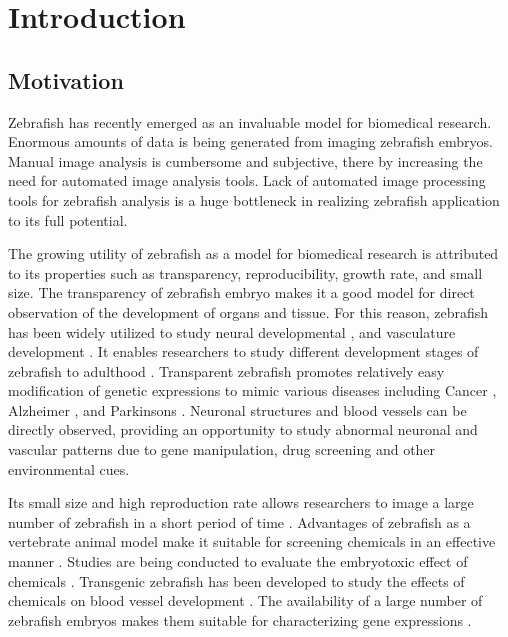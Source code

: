 \chapter{Introduction}\label{chap:Intro}

\section{Motivation}

Zebrafish has recently emerged as an invaluable model for biomedical research. Enormous amounts of data is being generated from imaging zebrafish embryos. Manual image analysis is cumbersome and subjective, there by increasing the need for automated image analysis tools. Lack of automated image processing tools for zebrafish analysis is a huge bottleneck in realizing zebrafish application to its full potential.

\par
The growing utility of zebrafish as a model for biomedical research is attributed to its properties such as transparency, reproducibility, growth rate, and small size. The transparency of zebrafish embryo makes it a good model for direct observation of the development of organs and tissue. For this reason, zebrafish has been widely utilized to study neural developmental \cite{campbell2006}, and vasculature development \cite{fouquet1997}. It enables researchers to study different development stages of zebrafish to adulthood \cite{Kimmel95}. Transparent zebrafish promotes relatively easy modification of genetic expressions to mimic various diseases including Cancer \cite{Amatruda08}, Alzheimer \cite{Newman11}, and Parkinsons \cite{Boehmler09}. Neuronal structures and blood vessels can be directly observed, providing an opportunity to study abnormal neuronal and vascular patterns due to gene manipulation, drug screening and other environmental cues.

\par
Its small size and high reproduction rate allows researchers to image a large number of zebrafish in a short period of time \cite{Leonard05}. Advantages of zebrafish as a vertebrate animal model make it suitable for screening chemicals in an effective manner \cite{Kaufman09}.  Studies are being conducted to evaluate the embryotoxic effect of chemicals \cite{Yang09}. Transgenic zebrafish has been developed to  study the effects of chemicals on blood vessel development \cite{Tran07}. The availability of a large number of zebrafish embryos makes them suitable for characterizing gene expressions \cite{Fan10}. 

